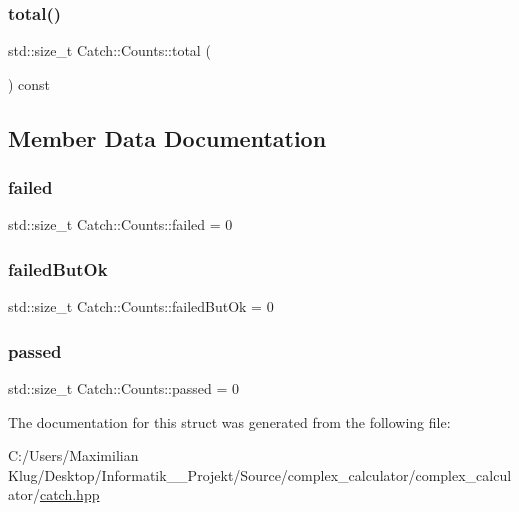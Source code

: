 \mbox{\label{struct_catch_1_1_counts_a94f969c09cf52d1339c085c9603cd1d3}} 
\subsubsection{\texorpdfstring{total()}{total()}}
{\footnotesize\ttfamily std\+::size\+\_\+t Catch\+::\+Counts\+::total (\begin{DoxyParamCaption}{ }\end{DoxyParamCaption}) const}



\subsection{Member Data Documentation}
\mbox{\label{struct_catch_1_1_counts_a19982a3817a3bc2c07f0290e71f497a3}} 
\subsubsection{\texorpdfstring{failed}{failed}}
{\footnotesize\ttfamily std\+::size\+\_\+t Catch\+::\+Counts\+::failed = 0}

\mbox{\label{struct_catch_1_1_counts_ac090973a2ff51394cd452718e75c073e}} 
\subsubsection{\texorpdfstring{failed\+But\+Ok}{failedButOk}}
{\footnotesize\ttfamily std\+::size\+\_\+t Catch\+::\+Counts\+::failed\+But\+Ok = 0}

\mbox{\label{struct_catch_1_1_counts_ad28daaf3de28006400208b6dd0c631e6}} 
\subsubsection{\texorpdfstring{passed}{passed}}
{\footnotesize\ttfamily std\+::size\+\_\+t Catch\+::\+Counts\+::passed = 0}



The documentation for this struct was generated from the following file\+:\begin{DoxyCompactItemize}
\item 
C\+:/\+Users/\+Maximilian Klug/\+Desktop/\+Informatik\+\_\+\_\+\+Projekt/\+Source/complex\+\_\+calculator/complex\+\_\+calculator/\mbox{\hyperlink{catch_8hpp}{catch.\+hpp}}\end{DoxyCompactItemize}
